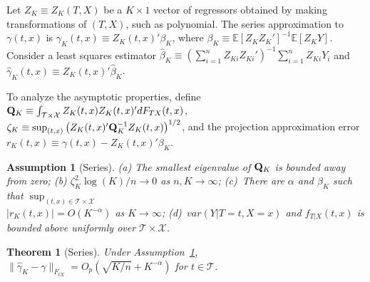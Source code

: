 \documentclass[lettersize, 12pt]{article}
\newtheorem{theorem}{Theorem}
\newtheorem{assumption}{Assumption}
\begin{document}
{Let $Z_K \equiv Z_K(T,X)$ be a $K\times 1$ vector of regressors obtained by making transformations of $(T,X)$, such as polynomial. 
The series approximation to $\gamma(t,x)$ is $\gamma_K(t,x) \equiv Z_K(t,x)'\beta_K$, where 
$\beta_K \equiv \mathbb{E}[Z_KZ_K']^{-1}\mathbb{E}[Z_KY]$.
Consider a least squares estimator $\hat \beta_K \equiv \left(\sum_{i=1}^n Z_{Ki}Z_{Ki}'\right)^{-1}\sum_{i=1}^n Z_{Ki}Y_i$ and  
$\hat \gamma_K(t,x) \equiv Z_K(t,x)'\hat\beta_K$.

To analyze the asymptotic properties, define  
${\bf Q}_{K} \equiv \int_{\mathcal{T}\times \mathcal{X}} Z_K(t,x) Z_K(t,x)' dF_{TX}(t,x)$, 
$\zeta_K \equiv \sup_{(t,x)}\big(Z_K(t,x)'{\bf Q}_K^{-1}Z_K(t,x)\big)^{1/2}$, and the projection approximation error $r_K(t,x) \equiv \gamma(t,x) - Z_K(t,x)'\beta_K$.

\begin{assumption}[Series]
(a) The smallest eigenvalue of ${\bf Q}_K$ is bounded away from zero;
(b) $\zeta_K^2\log(K)/n\rightarrow 0$ as $n, K\rightarrow\infty$;
(c)~There are $\alpha$ and $\beta_K$ such that $\sup_{(t,x)\in\mathcal{T}\times\mathcal{X}}$
\\
$| r_K(t,x) | = O(K^{-\alpha})$ as $K\rightarrow\infty$;
(d)~$var(Y|T=t, X=x)$ and $f_{T|X}(t, x)$ is bounded above uniformly over $\mathcal{T}\times\mathcal{X}$. 
%
%
%
%
\label{Aseries}
\end{assumption}

\begin{theorem}[Series]
Under Assumption~\ref{Aseries}, $\|\hat\gamma_K - \gamma\|_{F_{tX}} = O_p(\sqrt{K/n} + K^{-\alpha})$ for $t\in\mathcal{T}$.
\label{Tseries}
\end{theorem}

}
\end{document}
